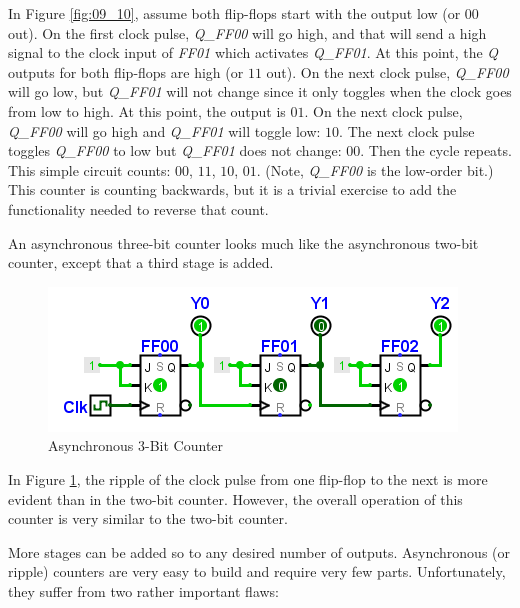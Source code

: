 In Figure \ref{fig:09_10}, assume both flip-flops start with the output low (or $ 00 $ out). On the first clock pulse, \emph{Q\_FF00} will go high, and that will send a high signal to the clock input of \emph{FF01} which activates \emph{Q\_FF01}. At this point, the \emph{Q} outputs for both flip-flops are high (or $ 11 $ out). On the next clock pulse, \emph{Q\_FF00} will go low, but \emph{Q\_FF01} will not change since it only toggles when the clock goes from low to high. At this point, the output is $ 01 $. On the next clock pulse, \emph{Q\_FF00} will go high and \emph{Q\_FF01} will toggle low: $ 10 $. The next clock pulse toggles \emph{Q\_FF00} to low but \emph{Q\_FF01} does not change: $ 00 $. Then the cycle repeats. This simple circuit counts: $ 00 $, $ 11 $, $ 10 $, $ 01 $. (Note, \emph{Q\_FF00} is the low-order bit.) This counter is counting backwards, but it is a trivial exercise to add the functionality needed to reverse that count.

An asynchronous three-bit counter looks much like the asynchronous two-bit counter, except that a third stage is added.

\begin{figure}[H]
	\centering
	\includegraphics[width=\maxwidth{.95\linewidth}]{gfx/09_11}
	\caption{Asynchronous 3-Bit Counter}
	\label{fig:09_11}
\end{figure}

In Figure \ref{fig:09_11}, the ripple of the clock pulse from one flip-flop to the next is more evident than in the two-bit counter. However, the overall operation of this counter is very similar to the two-bit counter.

More stages can be added so to any desired number of outputs. Asynchronous (or ripple) counters are very easy to build and require very few parts. Unfortunately, they suffer from two rather important flaws:

